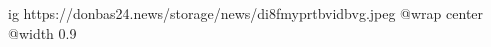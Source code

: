  
 
 
 
 

\ifcmt
  ig https://donbas24.news/storage/news/di8fmyprtbvidbvg.jpeg
  @wrap center
  @width 0.9
\fi
